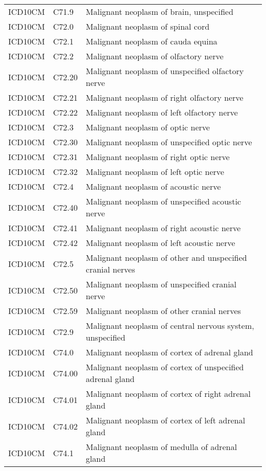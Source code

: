 \begin{table}[ht]
\begin{tabular}{lll}
  ICD10CM & C71.9 & Malignant neoplasm of brain, unspecified \\ 
  ICD10CM & C72.0 & Malignant neoplasm of spinal cord \\ 
  ICD10CM & C72.1 & Malignant neoplasm of cauda equina \\ 
  ICD10CM & C72.2 & Malignant neoplasm of olfactory nerve \\ 
  ICD10CM & C72.20 & Malignant neoplasm of unspecified olfactory nerve \\ 
  ICD10CM & C72.21 & Malignant neoplasm of right olfactory nerve \\ 
  ICD10CM & C72.22 & Malignant neoplasm of left olfactory nerve \\ 
  ICD10CM & C72.3 & Malignant neoplasm of optic nerve \\ 
  ICD10CM & C72.30 & Malignant neoplasm of unspecified optic nerve \\ 
  ICD10CM & C72.31 & Malignant neoplasm of right optic nerve \\ 
  ICD10CM & C72.32 & Malignant neoplasm of left optic nerve \\ 
  ICD10CM & C72.4 & Malignant neoplasm of acoustic nerve \\ 
  ICD10CM & C72.40 & Malignant neoplasm of unspecified acoustic nerve \\ 
  ICD10CM & C72.41 & Malignant neoplasm of right acoustic nerve \\ 
  ICD10CM & C72.42 & Malignant neoplasm of left acoustic nerve \\ 
  ICD10CM & C72.5 & Malignant neoplasm of other and unspecified cranial nerves \\ 
  ICD10CM & C72.50 & Malignant neoplasm of unspecified cranial nerve \\ 
  ICD10CM & C72.59 & Malignant neoplasm of other cranial nerves \\ 
  ICD10CM & C72.9 & Malignant neoplasm of central nervous system, unspecified \\ 
  ICD10CM & C74.0 & Malignant neoplasm of cortex of adrenal gland \\ 
  ICD10CM & C74.00 & Malignant neoplasm of cortex of unspecified adrenal gland \\ 
  ICD10CM & C74.01 & Malignant neoplasm of cortex of right adrenal gland \\ 
  ICD10CM & C74.02 & Malignant neoplasm of cortex of left adrenal gland \\ 
  ICD10CM & C74.1 & Malignant neoplasm of medulla of adrenal gland \\ 

\end{tabular}
\end{table}
